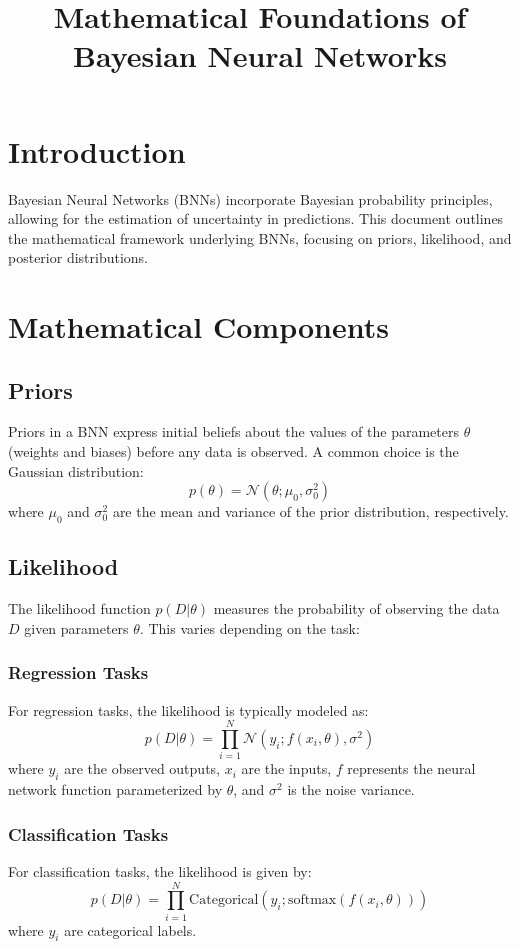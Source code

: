 \documentclass{article}
\title{Mathematical Foundations of Bayesian Neural Networks}
\author{}
\date{}
\begin{document}
\maketitle

\section{Introduction}
Bayesian Neural Networks (BNNs) incorporate Bayesian probability principles, allowing for the estimation of uncertainty in predictions. This document outlines the mathematical framework underlying BNNs, focusing on priors, likelihood, and posterior distributions.

\section{Mathematical Components}

\subsection{Priors}
Priors in a BNN express initial beliefs about the values of the parameters \( \theta \) (weights and biases) before any data is observed. A common choice is the Gaussian distribution:
\[
p(\theta) = \mathcal{N}(\theta; \mu_0, \sigma_0^2)
\]
where \( \mu_0 \) and \( \sigma_0^2 \) are the mean and variance of the prior distribution, respectively.

\subsection{Likelihood}
The likelihood function \( p(D|\theta) \) measures the probability of observing the data \( D \) given parameters \( \theta \). This varies depending on the task:

\subsubsection{Regression Tasks}
For regression tasks, the likelihood is typically modeled as:
\[
p(D|\theta) = \prod_{i=1}^N \mathcal{N}(y_i; f(x_i, \theta), \sigma^2)
\]
where \( y_i \) are the observed outputs, \( x_i \) are the inputs, \( f \) represents the neural network function parameterized by \( \theta \), and \( \sigma^2 \) is the noise variance.

\subsubsection{Classification Tasks}
For classification tasks, the likelihood is given by:
\[
p(D|\theta) = \prod_{i=1}^N \text{Categorical}(y_i; \text{softmax}(f(x_i, \theta)))
\]
where \( y_i \) are categorical labels.
\end{document}
